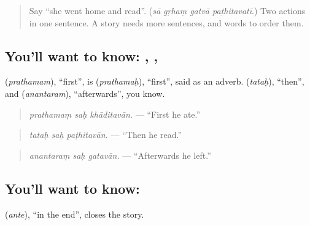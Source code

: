 \label{lesson:SA-C277-prathamam}



\begin{quote}
Say \textquotedblleft{}she went home and read\textquotedblright{}. (\emph{sā gṛhaṃ gatvā paṭhitavatī}.) Two actions in one sentence. A story needs more sentences, and words to order them.
\end{quote}

\subsection*{You'll want to know: , , }
\textbf{} (\emph{prathamam}), \textquotedblleft{}first\textquotedblright{}, is \textbf{} (\emph{prathamaḥ}), \textquotedblleft{}first\textquotedblright{}, said as an adverb. \textbf{} (\emph{tataḥ}), \textquotedblleft{}then\textquotedblright{}, and \textbf{} (\emph{anantaram}), \textquotedblleft{}afterwards\textquotedblright{}, you know.

\begin{quote}
\textbf{  }
\end{quote}

\begin{quote}
\emph{prathamaṃ saḥ khāditavān.} — \textquotedblleft{}First he ate.\textquotedblright{}
\end{quote}

\begin{quote}
\textbf{  }
\end{quote}

\begin{quote}
\emph{tataḥ saḥ paṭhitavān.} — \textquotedblleft{}Then he read.\textquotedblright{}
\end{quote}

\begin{quote}
\textbf{  }
\end{quote}

\begin{quote}
\emph{anantaraṃ saḥ gatavān.} — \textquotedblleft{}Afterwards he left.\textquotedblright{}
\end{quote}

\subsection*{You'll want to know: }
\textbf{} (\emph{ante}), \textquotedblleft{}in the end\textquotedblright{}, closes the story.

